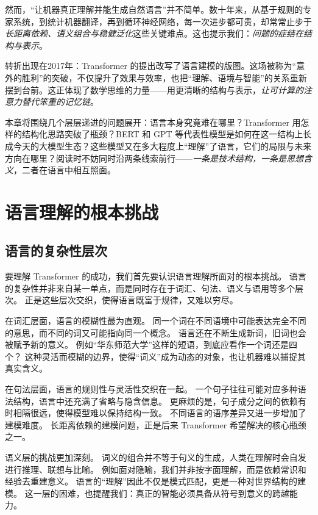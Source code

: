 然而，“让机器真正理解并能生成自然语言”并不简单。数十年来，从基于规则的专家系统，到统计机器翻译，再到循环神经网络，每一次进步都可贵，却常常止步于\emph{长距离依赖、语义组合与稳健泛化}这些关键难点。这也提示我们：\emph{问题的症结在结构与表示}。

转折出现在2017年：Transformer 的提出改写了语言建模的版图。这场被称为“意外的胜利”的突破，不仅提升了效果与效率，也把“理解、语境与智能”的关系重新摆到台前。这正体现了数学思维的力量——用更清晰的结构与表示，\emph{让可计算的注意力替代笨重的记忆链}。

本章将围绕几个层层递进的问题展开：语言本身究竟难在哪里？Transformer 用怎样的结构化思路突破了瓶颈？BERT 和 GPT 等代表性模型是如何在这一结构上长成今天的大模型生态？这些模型又在多大程度上“理解”了语言，它们的局限与未来方向在哪里？阅读时不妨同时沿两条线索前行——\emph{一条是技术结构，一条是思想含义}，二者在语言中相互照面。

\section{语言理解的根本挑战}

\subsection{语言的复杂性层次}

要理解 Transformer 的成功，我们首先要认识语言理解所面对的根本挑战。  
语言的复杂性并非来自某一单点，而是同时存在于词汇、句法、语义与语用等多个层次。  
正是这些层次交织，使得语言既富于规律，又难以穷尽。  

在词汇层面，语言的模糊性最为直观。  
同一个词在不同语境中可能表达完全不同的意思，而不同的词又可能指向同一个概念。  
语言还在不断生成新词，旧词也会被赋予新的意义。  
例如“华东师范大学”这样的短语，到底应看作一个词还是四个？  
这种灵活而模糊的边界，使得“词义”成为动态的对象，也让机器难以捕捉其真实含义。  

在句法层面，语言的规则性与灵活性交织在一起。  
一个句子往往可能对应多种语法结构，语言中还充满了省略与隐含信息。  
更麻烦的是，句子成分之间的依赖有时相隔很远，使得模型难以保持结构一致。  
不同语言的语序差异又进一步增加了建模难度。  
长距离依赖的建模问题，正是后来 Transformer 希望解决的核心瓶颈之一。  

语义层的挑战更加深刻。  
词义的组合并不等于句义的生成，人类在理解时会自发进行推理、联想与比喻。  
例如面对隐喻，我们并非按字面理解，而是依赖常识和经验去重建意义。  
语言的“理解”因此不仅是模式匹配，更是一种对世界结构的建模。  
这一层的困难，也提醒我们：真正的智能必须具备从符号到意义的跨越能力。  

